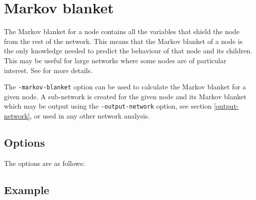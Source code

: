 \documentclass[a4paper,12pt]{article}
\newcommand{\code}[1]{{\footnotesize{{\tt #1}}}}
\begin{document}



\section{Markov blanket}
\label{markov-blanket}

The Markov blanket for a node contains all the variables that shield the node from the rest of the network. This means that the Markov blanket of a node is the only knowledge needed to predict the behaviour of that node and its children. This may be useful for large networks where some nodes are of particular interest. See \citet{bnlearn} for more details. 

The \code{-markov-blanket} option can be used to calculate the Markov blanket for a given node. A sub-network is created for the given node and its Markov blanket which may be output using the \code{-output-network} option, see  section \ref{output-network}, or used in any other network analysis. 
\subsection{Options}
\label{markov-blanket-options}

The options are as follows: 

{\begin{center}\end{center}}


\subsection{Example}
\label{calc-blanket-example}
\end{document}
